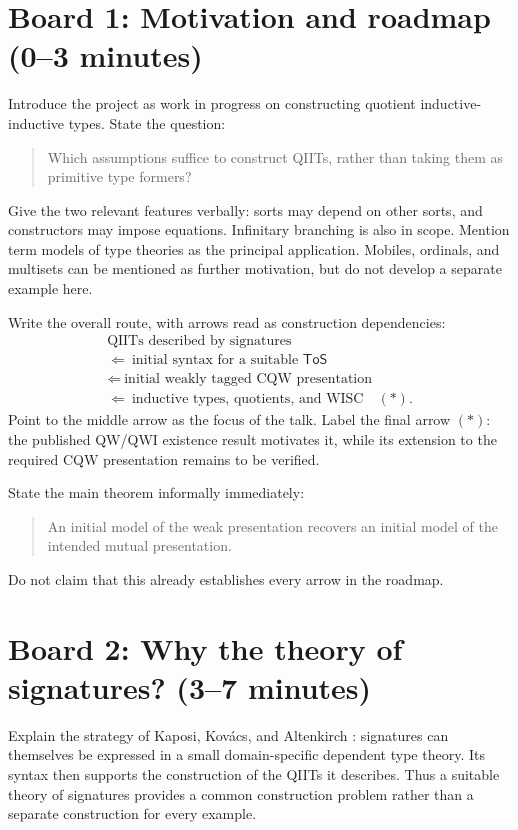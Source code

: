 \documentclass[11pt]{article}
\newcommand{\ToS}{\mathsf{ToS}}
\begin{document}
\section*{Board 1: Motivation and roadmap (0--3 minutes)}

Introduce the project as work in progress on constructing quotient
inductive-inductive types. State the question:
\begin{quote}
Which assumptions suffice to construct QIITs, rather than taking them as
primitive type formers?
\end{quote}
Give the two relevant features verbally: sorts may depend on other sorts,
and constructors may impose equations. Infinitary branching is also in scope.
Mention term models of type theories as the principal application. Mobiles,
ordinals, and multisets can be mentioned as further motivation, but do not
develop a separate example here.

Write the overall route, with arrows read as construction dependencies:
\[
\begin{gathered}
 \text{QIITs described by signatures}\\[-1mm]
 \Longleftarrow\ \text{initial syntax for a suitable }\ToS\\[-1mm]
 \Longleftarrow\ \text{initial weakly tagged CQW presentation}\\[-1mm]
 \Longleftarrow\ \text{inductive types, quotients, and WISC}\quad(*) .
\end{gathered}
\]
Point to the middle arrow as the focus of the talk. Label the final arrow
\((*)\): the published QW/QWI existence result motivates it, while its
extension to the required CQW presentation remains to be verified.

State the main theorem informally immediately:
\begin{quote}
An initial model of the weak presentation recovers an initial model of the
intended mutual presentation.
\end{quote}
Do not claim that this already establishes every arrow in the roadmap.

\section*{Board 2: Why the theory of signatures? (3--7 minutes)}

Explain the strategy of Kaposi, Kov\'acs, and Altenkirch
\cite{KKA19,KK20}: signatures can themselves be expressed in a small
domain-specific dependent type theory. Its syntax then supports the
construction of the QIITs it describes. Thus a suitable theory of signatures
provides a common construction problem rather than a separate construction
for every example.
\end{document}

